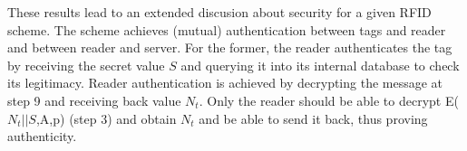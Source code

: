     These results lead to an extended discusion about security for a given RFID scheme. The \cite{BOM} scheme achieves (mutual)
    authentication between tags and reader and between reader and server. For the former, the reader authenticates the tag by
    receiving the secret value $S$ and querying it into its internal database to check its legitimacy. Reader authentication is
    achieved by decrypting the message at step 9 and receiving back value $N_t$. Only the reader should be able to decrypt 
    E($N_t||S$,A,p) (step 3) and obtain $N_t$ and be able to send it back, thus proving authenticity.
    
    \begin{adjustwidth}{-60pt}{}
\end{adjustwidth}
